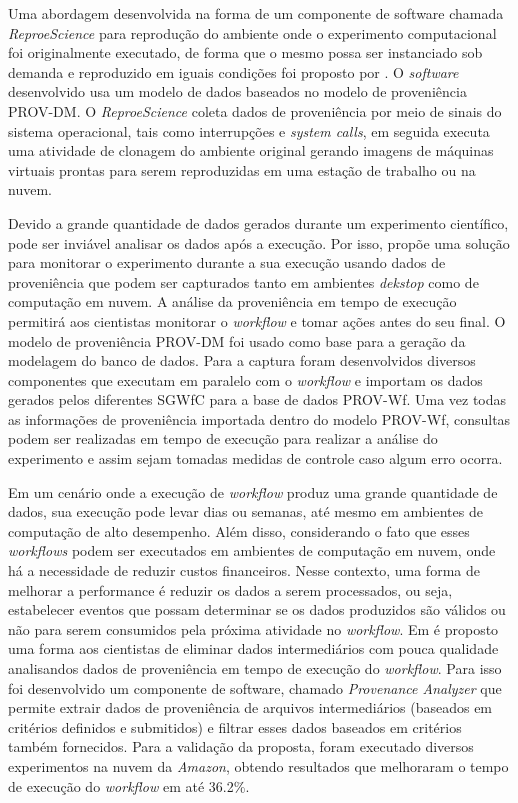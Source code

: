 Uma abordagem desenvolvida na forma de um componente de software chamada \textit{ReproeScience} para reprodução do ambiente onde o experimento computacional foi originalmente executado, de forma que o mesmo possa ser instanciado sob demanda e reproduzido em iguais condições foi proposto por \cite{oliveira}. O \textit{software} desenvolvido usa um modelo de dados baseados no modelo de proveniência PROV-DM. O \textit{ReproeScience} coleta dados de proveniência por meio de sinais do sistema operacional, tais como interrupções e \textit{system calls}, em seguida executa uma atividade de clonagem do ambiente original gerando imagens de máquinas virtuais prontas para serem reproduzidas em uma estação de trabalho ou na nuvem.

Devido a grande quantidade de dados gerados durante um experimento científico, pode ser inviável analisar os dados após a execução. Por isso, \cite{costa} propõe uma solução para monitorar o experimento durante a sua execução usando dados de proveniência que podem ser capturados tanto em ambientes \textit{dekstop} como de computação em nuvem. A análise da proveniência em tempo de execução permitirá aos cientistas monitorar o \textit{workflow} e tomar ações antes do seu final. O modelo de proveniência PROV-DM foi usado como base para a geração da modelagem do banco de dados. Para a captura foram desenvolvidos diversos componentes que executam em paralelo com o \textit{workflow} e importam os dados gerados pelos diferentes SGWfC para a base de dados PROV-Wf. Uma vez todas as informações de proveniência importada dentro do modelo PROV-Wf, consultas podem ser realizadas em tempo de execução para realizar a análise do experimento e assim sejam tomadas medidas de controle caso algum erro ocorra.

Em um cenário onde a execução de \textit{workflow} produz uma grande quantidade de dados, sua execução pode levar dias ou semanas, até mesmo em ambientes de computação de alto desempenho. Além disso, considerando o fato que esses \textit{workflows} podem ser executados em ambientes de computação em nuvem, onde há a necessidade de reduzir custos financeiros. Nesse contexto, uma forma de melhorar a performance é reduzir  os dados a serem processados, ou seja, estabelecer eventos que possam determinar se os dados produzidos são válidos ou não para serem consumidos pela próxima atividade no \textit{workflow}. Em \cite{goncalves} é proposto uma forma aos cientistas de eliminar dados intermediários com pouca qualidade analisandos dados de proveniência em tempo de execução do \textit{workflow}. Para isso foi desenvolvido um componente de software, chamado \textit{Provenance Analyzer} que permite extrair dados de proveniência de arquivos intermediários (baseados em critérios definidos e submitidos) e filtrar esses dados baseados em critérios também fornecidos. Para a validação da proposta, foram executado diversos experimentos na nuvem da \textit{Amazon}, obtendo resultados que melhoraram o tempo de execução do \textit{workflow} em até 36.2\%.

